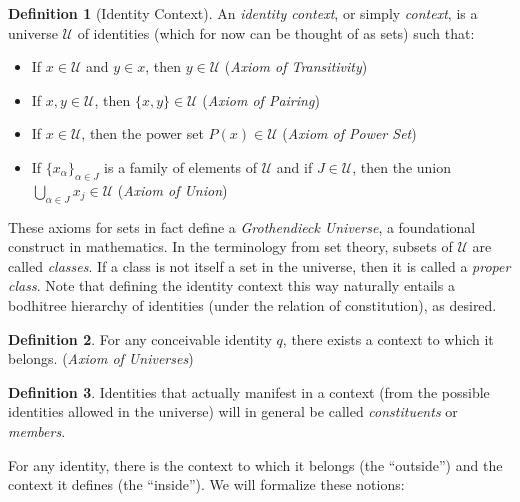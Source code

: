 \documentclass[pra,twocolumn,groupedaddress,10pt]{revtex4}
\theoremstyle{definition}
\newtheorem{defn}{Definition}[section]
\begin{document}
\begin{defn}[Identity Context]
	An \emph{identity context}, or simply \emph{context}, is a universe $\mathscr{U}$ of identities (which for now can be thought of as sets) such that:
	\begin{itemize}
		\item If $x \in \mathscr{U}$ and $y \in x$, then $y \in \mathscr{U}$ (\emph{Axiom of Transitivity})
		\item If $x, y \in \mathscr{U}$, then $\{x,y\} \in \mathscr{U}$ (\emph{Axiom of Pairing})
		\item If $x \in \mathscr{U}$, then the power set $P(x) \in \mathscr{U}$ (\emph{Axiom of Power Set})
		\item If $\{x_{\alpha}\}_{\alpha \in J}$ is a family of elements of $\mathscr{U}$ and if $J \in \mathscr{U}$, then the union $\bigcup_{\alpha \in J} x_j \in \mathscr{U}$ (\emph{Axiom of Union})
	\end{itemize}
	These axioms for sets in fact define a \emph{Grothendieck Universe}\cite{grothendieck}\cite{foundcat}, a foundational construct in mathematics. In the terminology from set theory, subsets of $\mathscr{U}$ are called \emph{classes}. If a class is not itself a set in the universe, then it is called a \emph{proper class}.
	Note that defining the identity context this way naturally entails a bodhitree hierarchy of identities (under the relation of constitution), as desired.
\end{defn}

\begin{defn}
	For any conceivable identity $q$, there exists a context to which it belongs. (\emph{Axiom of Universes}\cite{maclane})
\end{defn}

\begin{defn}
	Identities that actually manifest in a context (from the possible identities allowed in the universe) will in general be called \emph{constituents} or \emph{members}.
\end{defn}

For any identity, there is the context to which it belongs (the ``outside'') and the context it defines (the ``inside''). We will formalize these notions:
\end{document}
